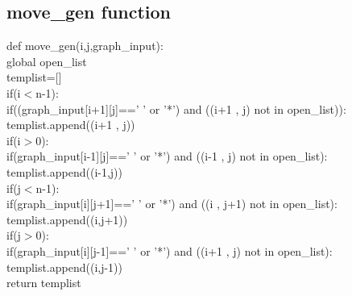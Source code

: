 \documentclass{article}
\begin{document}
\subsection*{move\_gen function}
\vspace{5pt}
def move\_gen(i,j,graph\_input):
\vspace{5pt}
    \\ \hspace*{20pt}global open\_list
    \vspace{2pt}
    \\ \hspace*{20pt}templist=[]
    \vspace{2pt}
    \\ \hspace*{20pt}if(i$<$n-1):
    \vspace{2pt}
    \\ \hspace*{30pt}    if((graph\_input[i+1][j]==' ' or '*') and ((i+1 , j) not in open\_list)):
    \vspace{2pt}
    \\ \hspace*{40pt}        templist.append((i+1 , j))
    \vspace{2pt}
    \\ \hspace*{20pt} if(i$>$0):
    \vspace{2pt}
    \\ \hspace*{30pt}    if(graph\_input[i-1][j]==' ' or '*') and ((i-1 , j) not in open\_list):
    \vspace{2pt}
    \\ \hspace*{30pt}        templist.append((i-1,j))
    \vspace{2pt}
    \\ \hspace*{20pt} if(j$<$n-1):
    \vspace{2pt}
    \\ \hspace*{30pt}    if(graph\_input[i][j+1]==' ' or '*') and ((i , j+1) not in open\_list):
    \vspace{2pt}
    \\ \hspace*{40pt}        templist.append((i,j+1))
    \vspace{2pt}
    \\ \hspace*{20pt} if(j$>$0):
    \vspace{2pt}
    \\ \hspace*{30pt}    if(graph\_input[i][j-1]==' ' or '*') and ((i+1 , j) not in open\_list):
    \vspace{2pt}
    \\ \hspace*{40pt}        templist.append((i,j-1))
    \vspace{2pt}
    \\ \hspace*{20pt}return templist
\end{document}
